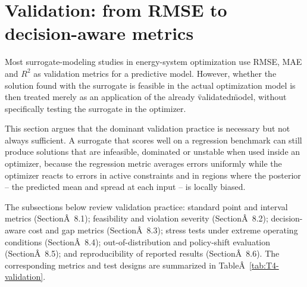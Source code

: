 \section{Validation: from RMSE to decision-aware metrics}
\label{sec:validation}

Most surrogate-modeling studies in energy-system optimization use RMSE,
MAE and $R^{2}$ as validation metrics for a predictive model. However,
whether the solution found with the surrogate is feasible in the actual
optimization model is then treated merely as an application of the
already \"validated\" model, without specifically testing the surrogate
in the optimizer.

This section argues that the dominant validation practice is necessary
but not always sufficient. A surrogate that scores well on a regression
benchmark can still produce solutions that are infeasible, dominated or
unstable when used inside an optimizer, because the regression metric
averages errors uniformly while the optimizer reacts to errors in active
constraints and in regions where the posterior -- the predicted mean and
spread at each input -- is locally biased.

The subsections below review validation practice: standard point and
interval metrics (SectionÂ~8.1); feasibility and violation severity
(SectionÂ~8.2); decision-aware cost and gap metrics
(SectionÂ~8.3); stress tests under extreme operating
conditions (SectionÂ~8.4); out-of-distribution and policy-shift
evaluation (SectionÂ~8.5); and reproducibility of reported results
(SectionÂ~8.6). The corresponding metrics and test designs
are summarized in
TableÂ~\ref{tab:T4-validation}.

